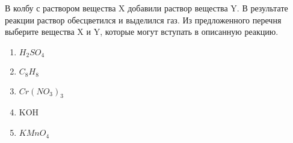 В колбу с раствором вещества X добавили раствор вещества Y. В результате реакции раствор обесцветился и выделился газ.
Из предложенного перечня выберите вещества X и Y, которые могут вступать в описанную реакцию. 
\begin{enumerate}
    \item $H_2SO_4$
    \item $C_8H_8$
    \item $Cr(NO_3)_3$
    \item KOH
    \item $KMnO_4$
\end{enumerate}


